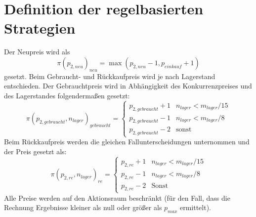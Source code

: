 \pagebreak
\section{Definition der regelbasierten Strategien}
\label{section:rulebased_definition}
Der Neupreis wird als
\begin{equation}
	\pi\left(p_{2, neu}\right)_{neu} = \max{\left(p_{2, neu} - 1, p_{einkauf} + 1\right)}
\end{equation}
gesetzt.
Beim Gebraucht- und Rückkaufpreis wird je nach Lagerstand entschieden.
Der Gebrauchtpreis wird in Abhängigkeit des Konkurrenzpreises und des Lagerstandes folgendermaßen gesetzt:
\begin{equation}
	\pi\left(p_{2, gebraucht}, n_{lager}\right)_{gebraucht} =
	\begin{cases}
		p_{2, gebraucht} + 1 & n_{lager} < m_{lager} / 15\\
		p_{2, gebraucht} - 1 & n_{lager} < m_{lager} / 8\\
		p_{2, gebraucht} - 2 & \text{sonst}
	\end{cases}
\end{equation}
Beim Rückkaufpreis werden die gleichen Fallunterscheidungen unternommen und der Preis gesetzt als:
\begin{equation}
	\pi(p_{2, re}, n_{lager})_{re} =
	\begin{cases}
		p_{2, re} + 1 & n_{lager} < m_{lager} / 15\\
		p_{2, re} - 1 & n_{lager} < m_{lager} / 8\\
		p_{2, re} - 2 & \text{Sonst}
	\end{cases}
\end{equation}
Alle Preise werden auf den Aktionsraum beschränkt (für den Fall, dass die Rechnung Ergebnisse kleiner als null oder größer als $p_{max}$ ermittelt).

\pagebreak
